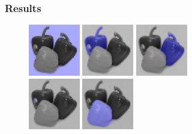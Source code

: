 \documentclass[8pt]{beamer}
\begin{document}
\begin{frame}
\end{frame}

\begin{frame}
\frametitle{Results}

\begin{figure}[ht]
\centering
\includegraphics[width=0.2\textwidth,height=0.2\textwidth]{peppers_seg_1.png} \hspace{.45cm}
\includegraphics[width=0.2\textwidth,height=0.2\textwidth]{peppers_seg_2.png} \hspace{.45cm}
\includegraphics[width=0.2\textwidth,height=0.2\textwidth]{peppers_seg_3.png} \\ \vspace{.45cm}
\includegraphics[width=0.2\textwidth,height=0.2\textwidth]{peppers_seg_4.png} \hspace{.45cm}
\includegraphics[width=0.2\textwidth,height=0.2\textwidth]{peppers_seg_5.png}
\end{figure}

\end{frame}
\end{document}
